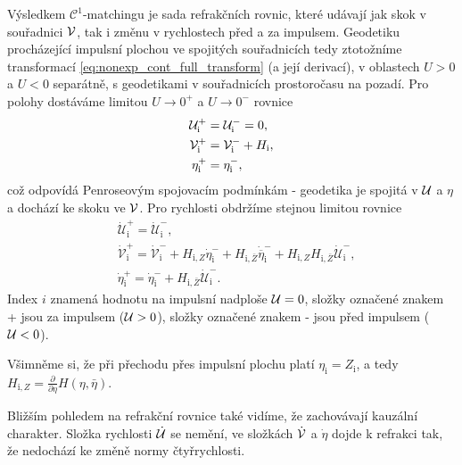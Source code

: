 Výsledkem $\mathcal{C}^1$-matchingu je sada refrakčních rovnic, které udávají jak skok v souřadnici $\mathcal{V}$,
tak i změnu v rychlostech před a za impulsem. Geodetiku procházející impulsní plochou ve spojitých souřadnicích tedy
ztotožníme transformací \eqref{eq:nonexp_cont_full_transform} (a její derivací), v oblastech $U > 0$ a $U < 0$ separátně, s geodetikami v souřadnicích prostoročasu na pozadí.
Pro polohy dostáváme limitou $U \to 0^+$ a $U \to 0^-$ rovnice
\begin{equation}
    \label{eq:refraction_nonexpanding_positions}
    \begin{split}
        \mathcal{U}^{+}_{\mathrm{i}} &= \mathcal{U}^{-}_{\mathrm{i}} = 0,\\
        \mathcal{V}^{+}_{\mathrm{i}} &= \mathcal{V}^{-}_{\mathrm{i}} + H_{\mathrm{i}},\\
        \eta^{+}_{\mathrm{i}} &= \eta^{-}_{\mathrm{i}},
    \end{split}
\end{equation}
což odpovídá Penroseovým spojovacím podmínkám - geodetika je spojitá v $\mathcal{U}$ a $\eta$ a dochází ke skoku ve $\mathcal{V}$.
Pro rychlosti obdržíme stejnou limitou rovnice
\begin{equation}
    \label{eq:refraction_nonexpanding_velocities}
    \begin{split}
        &\dot{\mathcal{U}}^{+}_{\mathrm{i}} = \dot{\mathcal{U}}^{-}_{\mathrm{i}},\\
        &\dot{\mathcal{V}}^{+}_{\mathrm{i}} = \dot{\mathcal{V}}_{\mathrm{i}}^{-} + H_{\mathrm{i}, Z}
        \dot{\eta}^{-}_{\mathrm{i}} + H_{\mathrm{i}, \bar{Z}} \dot{\overline{\eta}}^{-}_{\mathrm{i}} + 
        H_{\mathrm{i}, Z} H_{\mathrm{i}, \bar{Z}} \dot{\mathcal{U}}_{\mathrm{i}}^{-},\\
        &\dot{\eta}_{\mathrm{i}}^{+} =\dot{\eta}_{\mathrm{i}}^{-}+H_{\mathrm{i}, \bar{Z}}
        \dot{\mathcal{U}}_{\mathrm{i}}^{-}.
    \end{split}
\end{equation}
Index $i$ znamená hodnotu na impulsní nadploše $\mathcal{U} = 0$, složky označené znakem + jsou za impulsem ($\mathcal{U} > 0$),
složky označené znakem - jsou před impulsem ($\mathcal{U} <0$).

Všimněme si, že při přechodu přes impulsní plochu platí $\eta_{\mathrm{i}} = Z_{\mathrm{i}}$, a tedy $ H_{\mathrm{i},Z} = \frac{\partial}{\partial \eta} H(\eta, \bar{\eta})$.

Bližším pohledem na refrakční rovnice také vidíme, že zachovávají kauzální charakter. Složka rychlosti $\dot {\mathcal{U}}$ se
nemění, ve složkách $\dot {\mathcal{V}}$ a $\dot \eta$ dojde k refrakci tak, že nedochází ke změně normy čtyřrychlosti.

